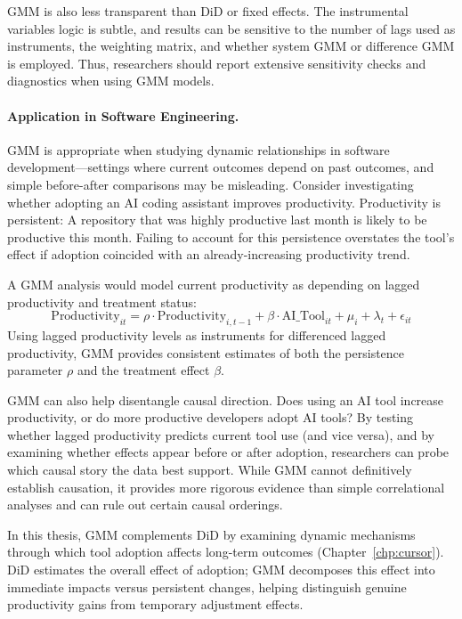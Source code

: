 GMM is also less transparent than DiD or fixed effects.
The instrumental variables logic is subtle, and results can be sensitive to the number of lags used as instruments, the weighting matrix, and whether system GMM or difference GMM is employed.
Thus, researchers should report extensive sensitivity checks and diagnostics when using GMM models.

\paragraph{Application in Software Engineering.}
GMM is appropriate when studying dynamic relationships in software development---settings where current outcomes depend on past outcomes, and simple before-after comparisons may be misleading.
Consider investigating whether adopting an AI coding assistant improves productivity.
Productivity is persistent: A repository that was highly productive last month is likely to be productive this month.
Failing to account for this persistence overstates the tool's effect if adoption coincided with an already-increasing productivity trend.

A GMM analysis would model current productivity as depending on lagged productivity and treatment status:
\begin{equation}
    \text{Productivity}_{it} = \rho \cdot \text{Productivity}_{i,t-1} + \beta \cdot \text{AI\_Tool}_{it} + \mu_i + \lambda_t + \epsilon_{it}
\end{equation}
Using lagged productivity levels as instruments for differenced lagged productivity, GMM provides consistent estimates of both the persistence parameter $\rho$ and the treatment effect $\beta$.

GMM can also help disentangle causal direction.
Does using an AI tool increase productivity, or do more productive developers adopt AI tools?
By testing whether lagged productivity predicts current tool use (and vice versa), and by examining whether effects appear before or after adoption, researchers can probe which causal story the data best support.
While GMM cannot definitively establish causation, it provides more rigorous evidence than simple correlational analyses and can rule out certain causal orderings.

In this thesis, GMM complements DiD by examining dynamic mechanisms through which tool adoption affects long-term outcomes (Chapter~\ref{chp:cursor}).
DiD estimates the overall effect of adoption; GMM decomposes this effect into immediate impacts versus persistent changes, helping distinguish genuine productivity gains from temporary adjustment effects.

